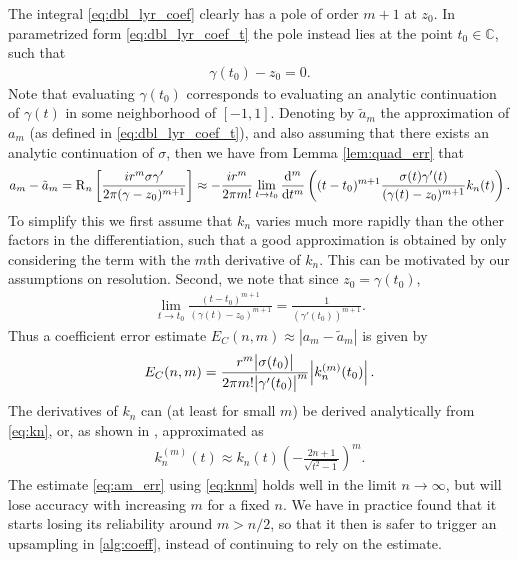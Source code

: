 \documentclass[hidelinks]{siamart1116}
\begin{document}
The integral \eqref{eq:dbl_lyr_coef} clearly has a pole of order $m+1$
at $z_0$. In parametrized form \eqref{eq:dbl_lyr_coef_t} the pole
instead lies at the point $t_0 \in \mathbb C$, such that
\begin{align}
  {\gamma}(t_0) - z_0 = 0.
  \label{eq:t0_def}
\end{align}
Note that evaluating ${\gamma}(t_0)$ corresponds to evaluating an
analytic continuation of $\gamma(t)$ in some neighborhood of $[-1,1]$.
Denoting by $\tilde a_m$ the approximation of $a_m$ (as defined in
\eqref{eq:dbl_lyr_coef_t}), and also assuming that there exists an
analytic continuation of ${{\sigma}}$, then we have from Lemma
\ref{lem:quad_err} that
\begin{align}
  {a}_m - \tilde {a}_m 
  = {\operatorname{R}_{n}}\left[ \frac{ir^m {{\sigma}} {\gamma}'}{2\pi ({\gamma}-z_0)^{m+1}} \right]
  \approx
  -\frac{ir^m}{2\pi m!} \lim_{t \to t_0} \dod[m]{}{t} \left(
  (t-t_0)^{m+1} \frac{{{\sigma}}(t) {\gamma}'(t)}{({\gamma}(t)-z_0)^{m+1}} k_n(t) 
  \right).
  \label{eq:laplace_coeff_err}
\end{align}
To simplify this we first assume that $k_n$ varies much more rapidly
than the other factors in the differentiation, such that a good
approximation is obtained by only considering the term with the $m$th
derivative of $k_n$. This can be motivated by our assumptions on
resolution. Second, we note that since $z_0={\gamma}(t_0)$,
\begin{align}
  \lim_{t \to t_0} \frac{(t-t_0)^{m+1}}{(\gamma(t) - z_0)^{m+1}} =   \frac{1}{(\gamma'(t_0))^{m+1}} .
\end{align}
Thus a coefficient error estimate
${E_C}(n, m)\approx|{a}_m-\tilde{a}_m|$ is given by
\begin{align}
  {E_C}(n, m) =
  \frac{r^m \abs{{{\sigma}}(t_0)}}
  {2\pi m! \abs{\gamma'(t_0)}^{m}}
  \abs{k_n^{(m)}(t_0)}.
  \label{eq:am_err}
\end{align}
The derivatives of $k_n$ can (at least for small $m$) be derived
analytically from \eqref{eq:kn}, or, as shown in
\cite{AfKlinteberg2016quad}, approximated as
\begin{align}
  k_n^{(m)}(t) \approx k_n(t) \left( -\frac{2n+1}{\sqrt{t^2-1}}   \right)^m .
  \label{eq:knm}
\end{align}
The estimate \eqref{eq:am_err} using \eqref{eq:knm} holds well in the
limit $n \to \infty$, but will lose accuracy with increasing $m$ for a
fixed $n$. We have in practice found that it starts losing its
reliability around $m > n/2$, so that it then is safer to trigger an
upsampling in \cref{alg:coeff}, instead of continuing to rely
on the estimate.
\end{document}
